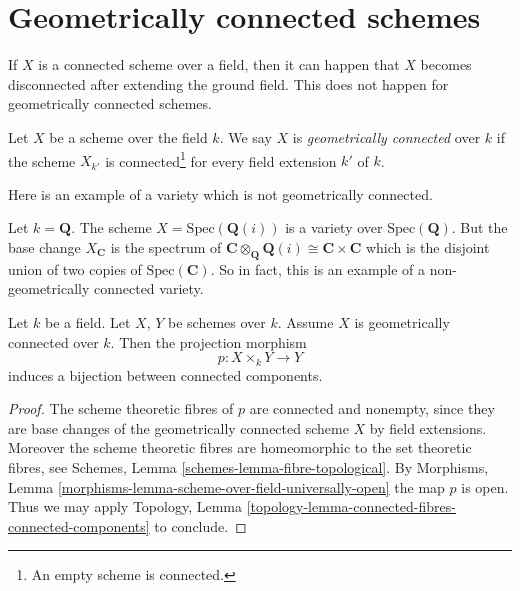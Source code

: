 \section{Geometrically connected schemes}
\label{section-geometrically-connected}

\noindent
If $X$ is a connected scheme over a field, then it can happen that $X$
becomes disconnected after extending the ground field. This does not happen
for geometrically connected schemes.

\begin{definition}
\label{definition-geometrically-connected}
Let $X$ be a scheme over the field $k$.
We say $X$ is {\it geometrically connected} over $k$
if the scheme $X_{k'}$ is connected\footnote{An empty scheme is connected.}
for every field extension $k'$ of $k$.
\end{definition}

\noindent
Here is an example of a variety which is not geometrically connected.

\begin{example}
\label{example-not-geometrically-irreducible}
Let $k = \mathbf{Q}$. The scheme
$X = \text{Spec}(\mathbf{Q}(i))$ is a variety over $\text{Spec}(\mathbf{Q})$.
But the base change $X_{\mathbf{C}}$ is the spectrum of
$\mathbf{C} \otimes_{\mathbf{Q}} \mathbf{Q}(i) \cong
\mathbf{C} \times \mathbf{C}$ which is the disjoint union of
two copies of $\text{Spec}(\mathbf{C})$. So in fact, this is an
example of a non-geometrically connected variety.
\end{example}

\begin{lemma}
\label{lemma-bijection-connected-components}
Let $k$ be a field.
Let $X$, $Y$ be schemes over $k$.
Assume $X$ is geometrically connected over $k$.
Then the projection morphism
$$
p : X \times_k Y \longrightarrow Y
$$
induces a bijection between connected components.
\end{lemma}

\begin{proof}
The scheme theoretic fibres of $p$ are connected
and nonempty, since they
are base changes of the geometrically connected scheme $X$ by
field extensions. Moreover the scheme theoretic fibres are
homeomorphic to the set theoretic fibres, see
Schemes, Lemma \ref{schemes-lemma-fibre-topological}.
By Morphisms, Lemma \ref{morphisms-lemma-scheme-over-field-universally-open}
the map $p$ is open.
Thus we may apply Topology,
Lemma \ref{topology-lemma-connected-fibres-connected-components}
to conclude.
\end{proof}

